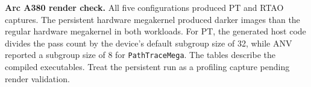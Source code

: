 \documentclass{article}
\begin{document}
\noindent\textbf{Arc A380 render check.} All five configurations produced PT and RTAO captures.
The persistent hardware megakernel produced darker images than the regular hardware megakernel in both workloads.
For PT, the generated host code divides the pass count by the device's default subgroup size of 32, while ANV reported a subgroup size of 8 for \texttt{PathTraceMega}.
The tables describe the compiled executables. Treat the persistent run as a profiling capture pending render validation.
\par\medskip

\end{document}
